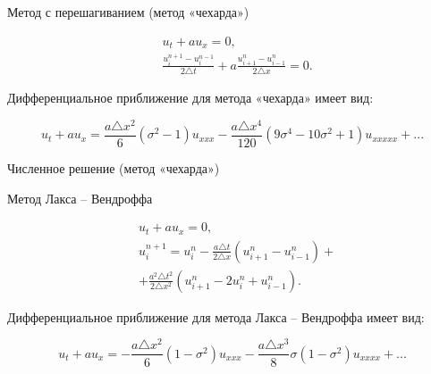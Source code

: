 \documentclass[10pt,xcolor=pst,aspectratio=169]{beamer}
\begin{document}
\begin{frame}{Метод с перешагиванием (метод «чехарда»)}

	\transdissolve[duration=0.1]
	\justifying
	\large

	\[
		\begin{split}
			&u_{t} + a u_{x} = 0 , \\
			&\frac{u^{n + 1}_{i} - u^{n - 1}_{i}}{2 \triangle t} + a \frac{u^{n}_{i + 1} - u^{n}_{i - 1}}{2 \triangle x} = 0 .
		\end{split}
	\]

	Дифференциальное приближение для метода «чехарда» имеет вид:

	\[
		u_{t} + a u_{x} = \frac{a \triangle x^{2}}{6} \left( \sigma^{2} - 1 \right) u_{xxx} - \frac{a \triangle x^{4}}{120} (9 \sigma^{4} - 10 \sigma^{2} + 1) u_{xxxxx} + ...
	\]

\end{frame}

\begin{frame}{Численное решение (метод «чехарда»)}

	\transdissolve[duration=0.1]
	\justifying
	\large

    \begin{figure}[h]
    \end{figure}

\end{frame}

\begin{frame}{Метод Лакса -- Вендроффа}

	\transdissolve[duration=0.1]
	\justifying
	\large

	\[
		\begin{split}
			&u_{t} + a u_{x} = 0 , \\
			&u^{n + 1}_{i} = u^{n}_{i} - \frac{a \triangle t}{2 \triangle x} (u^{n}_{i + 1} - u^{n}_{i - 1}) + \\
			& + \frac{a^{2} \triangle t^{2}}{2 \triangle x^{2}} (u^{n}_{i + 1} - 2 u^{n}_{i} + u^{n}_{i - 1}) .
		\end{split}
	\]

	Дифференциальное приближение для метода Лакса -- Вендроффа имеет вид:

	\[
		u_{t} + a u_{x} = - \frac{a \triangle x^{2}}{6} \left( 1 - \sigma^{2} \right) u_{xxx} - \frac{a \triangle x^{3}}{8} \sigma (1 - \sigma^{2}) u_{xxxx} + ...
	\]

\end{frame}
\end{document}

